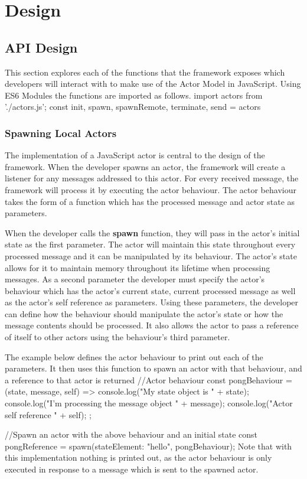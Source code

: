 \documentclass[12pt, a4paper]{report}
\newenvironment{code}
{\footnotesize\verbatim}{\endverbatim\normalfont}
\theoremstyle{definition}
\theoremstyle{definition}%
\theoremstyle{definition}%
\theoremstyle{definition}%
\theoremstyle{definition}%
\theoremstyle{definition}%
\begin{document}
\chapter{Design}
\section{API Design}
This section explores each of the functions that the framework exposes which developers will interact with to make use of the Actor Model in JavaScript. Using ES6 Modules the functions are imported as follows.
\begin{code}
import actors from './actors.js';
const { init, spawn, spawnRemote, terminate, send} = actors
\end{code}
\subsection{Spawning Local Actors}
The implementation of a JavaScript actor is central to the design of the framework. When the developer spawns an actor, the framework will create a listener for any messages addressed to this actor. For every received message, the framework will process it by executing the actor behaviour. The actor behaviour takes the form of a function which has the processed message and actor state as parameters.

When the developer calls the \textbf{spawn} function, they will pass in the actor's initial state as the first parameter. The actor will maintain this state throughout every processed message and it can be manipulated by its behaviour. The actor's state allows for it to maintain memory throughout its lifetime when processing messages. As a second parameter the developer must specify the actor's behaviour which has the actor's current state, current processed message as well as the actor's self reference as parameters. Using these parameters, the developer can define how the behaviour should manipulate the actor's state or how the message contents should be processed. It also allows the actor to pass a reference of itself to other actors using the behaviour's third parameter.

The example below defines the actor behaviour to print out each of the parameters. It then uses this function to spawn an actor with that behaviour, and a reference to that actor is returned
\begin{code}
//Actor behaviour
const pongBehaviour = (state, message, self) => {
    console.log("My state object is " + state);
    console.log("I'm processing the message object " + message);
    console.log("Actor self reference " + self);
};

//Spawn an actor with the above behaviour and an initial state
const pongReference = spawn({stateElement: "hello"}, pongBehaviour);
\end{code}
Note that with this implementation nothing is printed out, as the actor behaviour is only executed in response to a message which is sent to the spawned actor.
\end{document}
